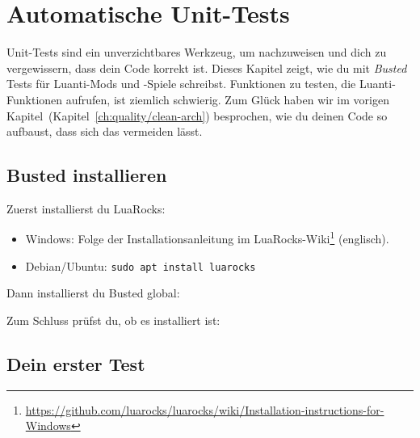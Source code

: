 \chapter{Automatische Unit-Tests}
\label{ch:quality/unit-testing}

Unit-Tests sind ein unverzichtbares Werkzeug,
um nachzuweisen und dich zu vergewissern, dass dein Code korrekt ist.
Dieses Kapitel zeigt, wie du mit \emph{Busted}
Tests für Luanti-Mods und -Spiele schreibst. Funktionen zu testen, die
Luanti-Funktionen aufrufen, ist ziemlich schwierig. Zum Glück haben wir
im vorigen Kapitel~(Kapitel~\ref{ch:quality/clean-arch}) besprochen, wie
du deinen Code so aufbaust, dass sich das vermeiden lässt.

\section{Busted installieren}\label{busted-installieren}

Zuerst installierst du LuaRocks:

\begin{itemize}
\tightlist
\item
  Windows: Folge der Installationsanleitung im LuaRocks-Wiki\footnote{\url{https://github.com/luarocks/luarocks/wiki/Installation-instructions-for-Windows}}
  (englisch).
\item
  Debian/Ubuntu: \texttt{sudo apt install luarocks}
\end{itemize}

Dann installierst du Busted global:

\begin{Shaded}
\begin{Highlighting}[]
\end{Highlighting}
\end{Shaded}

Zum Schluss prüfst du, ob es installiert ist:

\begin{Shaded}
\begin{Highlighting}[]
\end{Highlighting}
\end{Shaded}

\section{Dein erster Test}\label{dein-erster-test}

